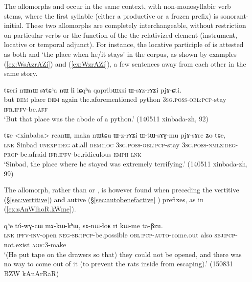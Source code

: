 The allomorphs  and  occur in the same context, with non-monosyllabic verb stems, where the first syllable (either a productive or a frozen prefix) is sonorant-initial. These two allomorphs are completely interchangeable, without restriction on particular verbs or the function of the the relativized element (instrument, locative or temporal adjunct). For instance, the locative participle of  is attested as both  and  `the place when he/it stays' in the corpus, as shown by examples (\ref{ex:WsAzrAZi}) and (\ref{ex:WzrAZi}), a few sentences away from each other in the same story.

\begin{exe}
\ex \label{ex:WsAzrAZi}
\gll  tɕeri nɯnɯ sɤtɕʰa nɯ li iɕqʰa qapribɯxsi ɯ-sɤz-rɤʑi pjɤ-ɕti. \\
but \textsc{dem} place \textsc{dem} again the.aforementioned python \textsc{3sg}.\textsc{poss}-\textsc{obl}:\textsc{pcp}-stay \textsc{ifr}.\textsc{ipfv}-be.\textsc{aff} \\
\glt `But that place was the abode of a python.' (140511 xinbada-zh, 92)
\end{exe}

\begin{exe}
\ex \label{ex:WzrAZi}
\gll tɕe <xinbaba> rcanɯ, maka nɯtɕu ɯ-z-rɤʑi ɯ-tɯ-sɤɣ-mu pjɤ-sɤre ʑo tɕe,\\
\textsc{lnk} Sinbad \textsc{unexp}:\textsc{deg} at.all \textsc{dem}:\textsc{loc} \textsc{3sg}.\textsc{poss}-\textsc{obl}:\textsc{pcp}-stay \textsc{3sg}.\textsc{poss}-\textsc{nmlz}:\textsc{deg}-\textsc{prop}-be.afraid \textsc{ifr}.\textsc{ipfv}-be.ridiculous \textsc{emph} \textsc{lnk}\\
\glt `Sinbad, the place where he stayed was extremely terrifying.' (140511 xinbada-zh, 99)
\end{exe}

The  allomorph, rather than  or , is however found when preceding the vertitive (§\ref{sec:vertitive}) and autive (§\ref{sec:autobenefactive} ) prefixes, as in (\ref{ex:sAnWlhoR.kWme}).

\begin{exe}
\ex \label{ex:sAnWlhoR.kWme}
\gll  qʰe tú-wɣ-cɯ mɤ-kɯ-kʰɯ, sɤ-nɯ-ɬoʁ ri kɯ-me ta-βzu. \\
\textsc{lnk} \textsc{ipfv}-\textsc{inv}-open \textsc{neg}-\textsc{sbj}:\textsc{pcp}-be.possible \textsc{obl}:\textsc{pcp}-\textsc{auto}-come.out also \textsc{sbj}:\textsc{pcp}-not.exist \textsc{aor}:3\flobv{}-make \\
\glt `(He put tape on the drawers so that) they could not be opened, and there was no way to come out of it (to prevent the rats inside from escaping).' (150831 BZW kAnArRaR)
\end{exe}

